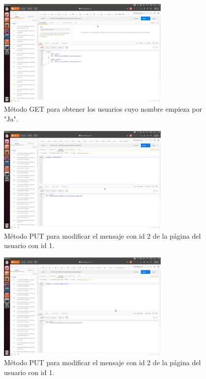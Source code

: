 \documentclass[12pt,a4paper, spanish]{article}
\begin{document}
\begin{figure}[H]
	\centering
	\includegraphics[width=0.75\textwidth]{images/captura15.jpg}
	\caption{Método GET para obtener los usuarios cuyo nombre empieza por "Ja".}
\end{figure}

\begin{figure}[H]
	\centering
	\includegraphics[width=0.75\textwidth]{images/captura16.jpg}
	\caption{Método PUT para modificar el mensaje con id 2 de la página del usuario con id 1.}
\end{figure}

\begin{figure}[H]
	\centering
	\includegraphics[width=0.75\textwidth]{images/captura17.jpg}
	\caption{Método PUT para modificar el mensaje con id 2 de la página del usuario con id 1.}
\end{figure}
\end{document}

